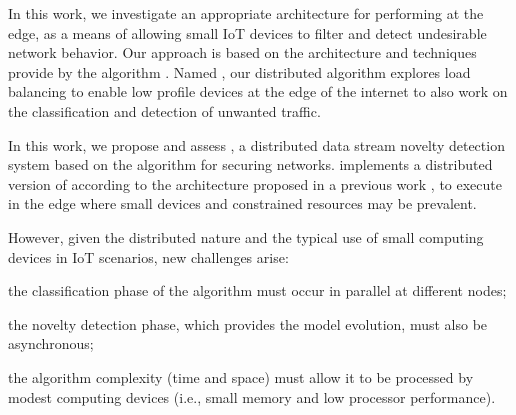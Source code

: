 
In this work, we investigate an appropriate architecture for performing \nd at
the edge, as a means of allowing small IoT devices to filter and detect undesirable
network behavior.
Our approach is based on the \arch architecture \cite{Cassales2019a} and \nd
techniques provide by the \minas algorithm \cite{Faria2015minas}.
Named \mfog, our distributed algorithm explores load balancing to enable low
profile devices at the edge of the internet to also work on the classification
and detection of unwanted traffic.


In this work, we propose and assess \mfog, a distributed data stream
novelty detection system based on the algorithm \minas for securing \iot networks.
\mfog implements a distributed version of \minas according to the \arch
architecture proposed in a previous work \cite{Cassales2019a}, to execute in the
edge where small devices and constrained resources may be prevalent.

However, given the distributed nature and the typical use of small computing
devices in IoT scenarios, new challenges arise:
\begin{enumerate*}[label=(\emph{\roman*})]
  \item the classification phase of the algorithm must occur in parallel at
  different nodes;
  \item the novelty detection phase, which provides the model evolution, must
  also be asynchronous;
  \item the algorithm complexity (time and space) must allow it to be processed
  by modest computing devices (i.e., small memory and low processor performance).
\end{enumerate*}

